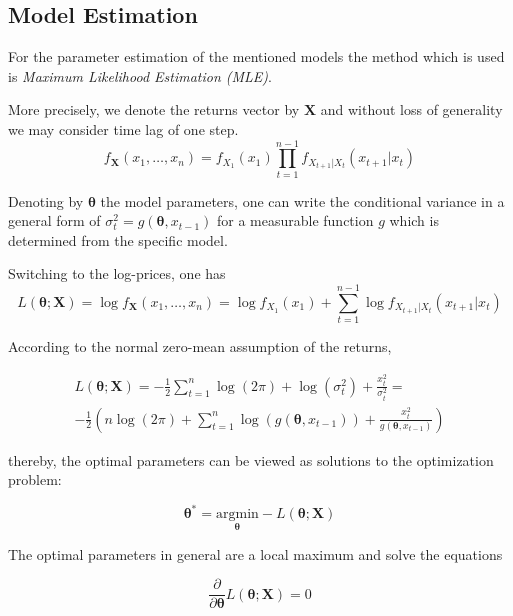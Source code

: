 \documentclass[a4paper, oneside]{discothesis}
\begin{document}
\subsection{Model Estimation}

For the parameter estimation of the mentioned models the method which is used is \textit{Maximum Likelihood Estimation (MLE)}.

More precisely, we denote the returns vector by $\mathbf{X}$ and without loss of generality we may consider time lag of one step. 
\begin{equation}
    f_{\bm{X}}(x_1, \dots, x_n) = f_{X_1}(x_1)\prod_{t=1}^{n-1}f_{X_{t+1}|X_t}(x_{t+1}|x_t)
\end{equation}


Denoting by $\bm{\theta}$ the model parameters, one can write the conditional variance in a general form of $\sigma_t^2 = g(\bm{\theta}, x_{t-1})$ for a measurable function $g$ which is determined from the specific model. 

Switching to the log-prices, one has
\begin{equation}
    L\left(\bm{\theta}; \bm{X}\right) = \log f_{\bm{X}}(x_1, \dots, x_n) = \log f_{X_1}(x_1) + \sum_{t=1}^{n-1} \log  f_{X_{t+1}|X_t}(x_{t+1}|x_t) 
\end{equation}

According to the normal zero-mean assumption of the returns,

\begin{equation}
\begin{split}
      L\left(\bm{\theta}; \bm{X}\right) = -\frac{1}{2}\sum_{t=1}^n \log(2\pi)+\log(\sigma_t^2)+\frac{x_t^2}{\sigma_t^2}=\\-\frac{1}{2}\left(n\log(2\pi)+\sum_{t=1}^n \log(g(\bm{\theta}, x_{t-1}))+\frac{x_t^2}{g(\bm{\theta}, x_{t-1})}\right)
\end{split}
\end{equation}

thereby, the optimal parameters can be viewed as solutions to the optimization problem:

\begin{equation}
    \bm{\theta}^* = \underset{\bm{\theta}}{\mathrm{argmin }} -L\left(\bm{\theta}; \bm{X}\right)
\end{equation}

The optimal parameters in general are a local maximum and solve the equations

\begin{equation}\label{eq:scores}
    \frac{\partial}{\partial\bm{\theta}}L\left(\bm{\theta}; \bm{X}\right) = 0
\end{equation}
\end{document}
